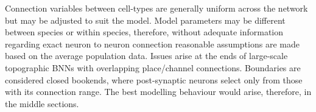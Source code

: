 Connection variables between cell-types are generally uniform across the network
but may be adjusted to suit the model.  Model parameters may be different
between species or within species, therefore, without adequate information
regarding exact neuron to neuron connection reasonable assumptions are made
based on the average population data.  Issues arise at the ends of large-scale
topographic BNNs with overlapping place\slash channel connections.  Boundaries
are considered closed bookends, where post-synaptic neurons select only from
those with its connection range.  The best modelling behaviour would arise,
therefore, in the middle sections.










